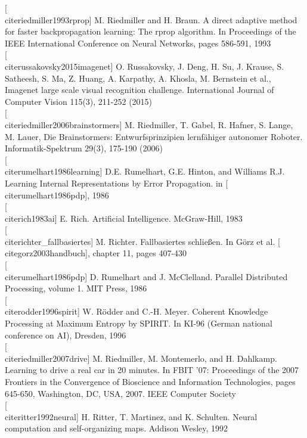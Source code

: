 \documentclass[10pt]{book}
\begin{document}
[\\cite{riedmiller1993rprop}] M. Riedmiller and H. Braun. A direct adaptive method for faster backpropagation learning: The rprop algorithm. In Proceedings of the IEEE International Conference on Neural Networks, pages 586-591, 1993\\[0pt]
[\\cite{russakovsky2015imagenet}] O. Russakovsky, J. Deng, H. Su, J. Krause, S. Satheesh, S. Ma, Z. Huang, A. Karpathy, A. Khosla, M. Bernstein et al., Imagenet large scale visual recognition challenge. International Journal of Computer Vision 115(3), 211-252 (2015)\\[0pt]
[\\cite{riedmiller2006brainstormers}] M. Riedmiller, T. Gabel, R. Hafner, S. Lange, M. Lauer, Die Brainstormers: Entwurfsprinzipien lernfähiger autonomer Roboter. Informatik-Spektrum 29(3), 175-190 (2006)\\[0pt]
[\\cite{rumelhart1986learning}] D.E. Rumelhart, G.E. Hinton, and Williams R.J. Learning Internal Representations by Error Propagation. in [\\cite{rumelhart1986pdp}], 1986\\[0pt]
[\\cite{rich1983ai}] E. Rich. Artificial Intelligence. McGraw-Hill, 1983\\[0pt]
[\\cite{richter_fallbasiertes}] M. Richter. Fallbasiertes schließen. In Görz et al. [\\cite{gorz2003handbuch}], chapter 11, pages 407-430\\[0pt]
[\\cite{rumelhart1986pdp}] D. Rumelhart and J. McClelland. Parallel Distributed Processing, volume 1. MIT Press, 1986\\[0pt]
[\\cite{rodder1996spirit}] W. Rödder and C.-H. Meyer. Coherent Knowledge Processing at Maximum Entropy by SPIRIT. In KI-96 (German national conference on AI), Dresden, 1996\\[0pt]
[\\cite{riedmiller2007drive}] M. Riedmiller, M. Montemerlo, and H. Dahlkamp. Learning to drive a real car in 20 minutes. In FBIT '07: Proceedings of the 2007 Frontiers in the Convergence of Bioscience and Information Technologies, pages 645-650, Washington, DC, USA, 2007. IEEE Computer Society\\[0pt]
[\\cite{ritter1992neural}] H. Ritter, T. Martinez, and K. Schulten. Neural computation and self-organizing maps. Addison Wesley, 1992\\[0pt]
\end{document}
